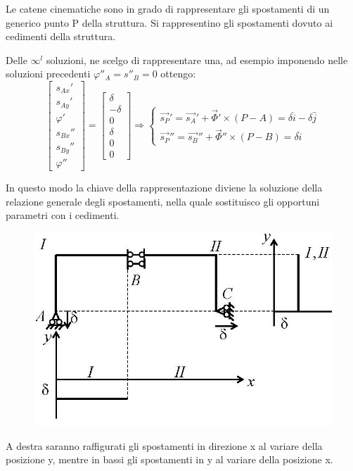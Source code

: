 \documentclass{article}
\begin{document}
\begin{adjustwidth}{2in}{}
Le catene cinematiche sono in grado di rappresentare gli spostamenti di un generico punto P della struttura. 
Si rappresentino gli spostamenti dovuto ai cedimenti della struttura. \newline 

Delle $\infty^l$ soluzioni, ne scelgo di rappresentare una, ad esempio imponendo nelle soluzioni precedenti $\varphi''_A = s''_B = 0$ ottengo: 
 \[ 
\left[ \begin{array}{c}
	s_{Ax}' \\
	s_{Ay}' \\
	\varphi' \\
	s_{Bx}'' \\
	s_{By}'' \\
	\varphi''
\end{array}\right] = \left[\begin{array}{c}
	\delta \\
	-\delta \\
	0 \\
	\delta \\
	0 \\
	0
\end{array} \right] \Rightarrow \begin{cases}
\vec{s_P}' = \vec{s_A}' + \vec{\Phi}'\times (P-A) = \delta\hat{i} - \delta\hat{j} \\
\vec{s_P}'' = \vec{s_B}'' + \vec{\Phi}''\times (P-B) = \delta\hat{i} 
\end{cases}
\] 

In questo modo la chiave della rappresentazione diviene la soluzione della relazione generale degli spostamenti, nella quale sostituisco gli opportuni parametri con i cedimenti. 
\begin{figure}[H]
	\centering
	\includegraphics[width=0.3\linewidth]{immagini/1.PARTE2_Pagina_33}
\end{figure}
A destra saranno raffigurati gli spostamenti in direzione x al variare della posizione y, mentre in bassi gli spostamenti in y al variare della posizione x. \newline


\end{adjustwidth}
\end{document}
